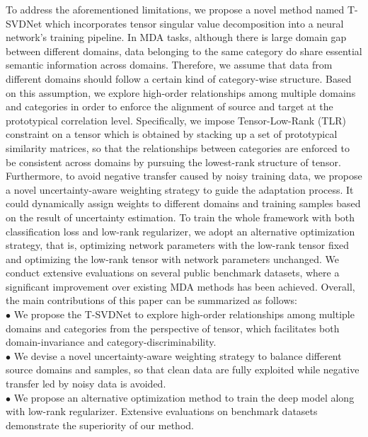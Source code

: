 \documentclass[10pt,twocolumn,letterpaper]{article}
\begin{document}
To address the aforementioned limitations, we propose a novel method named T-SVDNet which incorporates tensor singular value decomposition into a neural network's training pipeline. In MDA tasks, although there is large domain gap between different domains, data belonging to the same category do share essential semantic information across domains. Therefore, we assume that data from different domains should follow a certain kind of category-wise structure. Based on this assumption, we explore high-order relationships among multiple domains and categories in order to enforce the alignment of source and target at the prototypical correlation level. Specifically, we impose Tensor-Low-Rank (TLR) constraint on a tensor which is obtained by stacking up a set of prototypical similarity matrices, so that the relationships between categories are enforced to be consistent across domains by pursuing the lowest-rank structure of tensor. Furthermore, to avoid negative transfer \cite{pan2009survey} caused by noisy training data, we propose a novel uncertainty-aware weighting strategy to guide the adaptation process. It could dynamically assign weights to different domains and training samples based on the result of uncertainty estimation. To train the whole framework with both classification loss and low-rank regularizer, we adopt an alternative optimization strategy, that is, optimizing network parameters with the low-rank tensor fixed and optimizing the low-rank tensor with network parameters unchanged. We conduct extensive evaluations on several public benchmark datasets, where a significant improvement over existing MDA methods has been achieved. Overall, the main contributions of this paper can be summarized as follows:\\
$\bullet$ We propose the T-SVDNet to explore high-order relationships among multiple domains and categories from the perspective of tensor, which facilitates both domain-invariance and category-discriminability.\\
$\bullet$ We devise a novel uncertainty-aware weighting strategy to balance different source domains and samples, so that clean data are fully exploited while negative transfer led by noisy data is avoided. \\
$\bullet$ We propose an alternative optimization method to train the deep model along with low-rank regularizer. Extensive evaluations on benchmark datasets demonstrate the superiority of our method. 
\end{document}
